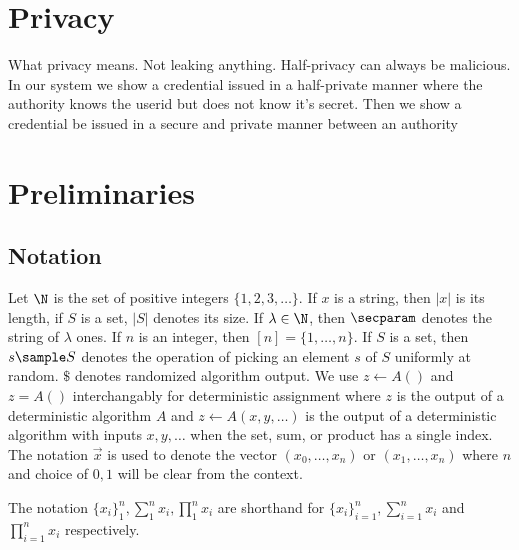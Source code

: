 





 








% 
% 

\section{Privacy}\label{sec:privacy}
What privacy means. Not leaking anything. Half-privacy can always be malicious. 
In our system we show a credential issued in a half-private manner where the authority knows the userid but does not know it's secret. Then we show a credential be issued in a secure and private manner between an authority



\section{Preliminaries}\label{sec:preliminaries}
\subsection{Notation}
Let $\N$ is the set of positive integers $\{1,2,3,\ldots\}$. If $x$ is a string, then $|x|$ is its length, if $S$ is a set, $|S|$ denotes its size. If $\lambda \in \N$, then $\secparam$ denotes the string of $\lambda$ ones. If $n$ is an integer, then $[n] = \{1, \ldots,n\}.$ If $S$ is a set, then $s \sample S$ denotes the operation of picking an element $s$ of $S$ uniformly at random. $\$$ denotes randomized algorithm output. We use $z \gets A()$ and $z = A()$ interchangably for deterministic assignment where $z$ is the output of a deterministic algorithm $A$ and $z \gets A(x,y,\ldots)$ is the output of a deterministic algorithm with inputs $x,y,\ldots$ when the set, sum, or product has a single index. 
The notation $\vec{x}$ is used to denote the vector $(x_0, \ldots,x_n)$ or $(x_1, \ldots, x_n)$ where $n$ and choice of $0, 1$ will be clear from the context.

The notation $\{x_i\}_1^n, \sum_1^n x_i, \prod_1^n x_i$ are shorthand for $\{x_i\}_{i=1}^n, \sum_{i=1}^n x_i$ and $\prod_{i=1}^n x_i$ respectively. 

